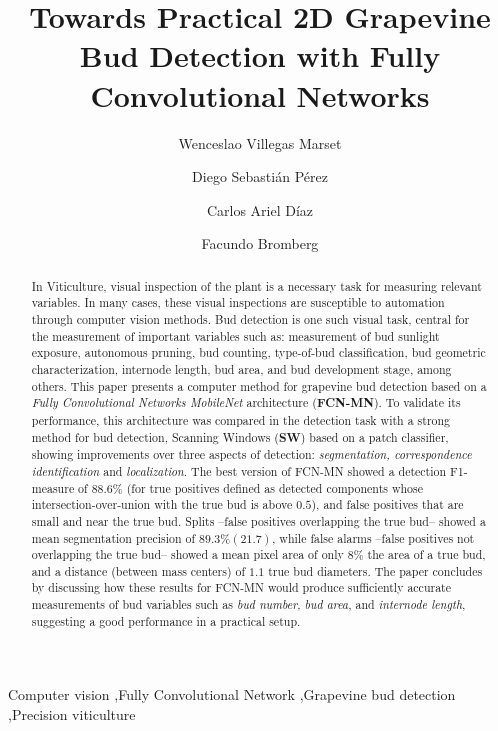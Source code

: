 \documentclass[a4paper,authoryear,review]{elsarticle}
\begin{document}
\begin{frontmatter}

\title{Towards Practical 2D Grapevine Bud Detection with Fully Convolutional Networks}

\author[utn]{Wenceslao Villegas Marset}

\author[utn]{Diego Sebastián Pérez}

\author[utn]{Carlos Ariel Díaz}

\author[utn,conicet]{Facundo Bromberg}

\address[utn]{Universidad Tecnológica Nacional. Dpto. de Sistemas de la Información. Grupo de Inteligencia Artificial DHARMa, Mendoza, Argentina.}

\address[conicet]{Consejo Nacional de Investigaciones Científicas y Técnicas (CONICET), Argentina.}


\begin{abstract}
In Viticulture, visual inspection of the plant is a necessary task for measuring relevant variables. In many cases, these visual inspections are susceptible to automation through computer vision methods. Bud detection is one such visual task, central for the measurement of important variables such as: measurement of bud sunlight exposure, autonomous pruning, bud counting, type-of-bud classification, bud geometric characterization, internode length, bud area, and bud development stage, among others. This paper presents a computer method for grapevine bud detection based on a \emph{Fully Convolutional Networks MobileNet} architecture (\textbf{FCN-MN}). To validate its performance, this architecture was compared in the detection task with a strong method for bud detection, Scanning Windows (\textbf{SW}) based on a patch classifier, showing improvements over three aspects of detection: \emph{segmentation, correspondence identification} and \emph{localization}. 
%
The best version of FCN-MN showed a detection F1-measure of $88.6\%$ (for true positives defined as detected components whose intersection-over-union with the true bud is above $0.5$), and false positives that are small and near the true bud. Splits --false positives overlapping the true bud-- showed a mean segmentation precision of $89.3\% (21.7)$, while false alarms --false positives not overlapping the true bud-- showed a mean pixel area of only $8\%$ the area of a true bud, and a distance (between mass centers) of $1.1$ true bud diameters. 
%
The paper concludes by discussing how these results for FCN-MN would produce sufficiently accurate measurements of bud variables such as \emph{bud number}, \emph{bud area}, and \emph{internode length}, suggesting a good performance in a practical setup.
\end{abstract}

\begin{keyword}
Computer vision \sep Fully Convolutional Network \sep Grapevine bud detection \sep Precision viticulture
\end{keyword}
\end{frontmatter}
\end{document}
